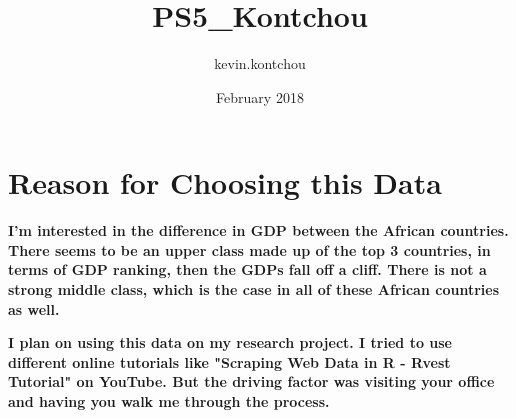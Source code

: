 \documentclass{article}
\title{PS5_Kontchou}
\author{kevin.kontchou }
\date{February 2018}
\begin{document}
\maketitle{}

\section{Reason for Choosing this Data}

\textbf{I'm interested in the difference in GDP between the African countries. There seems to be an upper class made up of the top 3 countries, in terms of GDP ranking, then the GDPs fall off a cliff. There is not a strong middle class, which is the case in all of these African countries as well.} 

\textbf{
I plan on using this data on my research project. I tried to use different online tutorials like "Scraping Web Data in R - Rvest Tutorial" on YouTube. But the driving factor was visiting your office and having you walk me through the process.}
\end{document}

